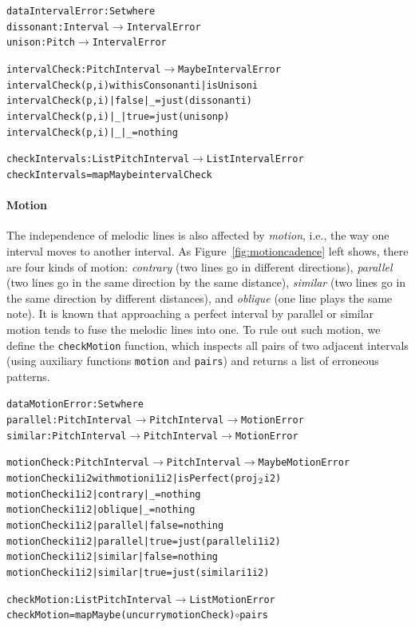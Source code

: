 \begin{alltt}
data IntervalError : Set where
  dissonant : Interval \(\rightarrow\) IntervalError
  unison    : Pitch    \(\rightarrow\) IntervalError

intervalCheck : PitchInterval \(\rightarrow\) Maybe IntervalError
intervalCheck (p , i) with isConsonant i | isUnison i
intervalCheck (p , i) | false | _    = just (dissonant i)
intervalCheck (p , i) | _     | true = just (unison p)
intervalCheck (p , i) | _     | _    = nothing

checkIntervals : List PitchInterval \(\rightarrow\) List IntervalError
checkIntervals = mapMaybe intervalCheck
\end{alltt}

\paragraph{Motion}

\MotionCadence

The independence of melodic lines is also affected by \emph{motion},
i.e., the way one interval moves to another interval.
As Figure~\ref{fig:motioncadence} left shows, there are four kinds of motion:
\emph{contrary} (two lines go in different directions),
\emph{parallel} (two lines go in the same direction by the same
distance), \emph{similar} (two lines go in the same direction by
different distances), and \emph{oblique} (one line plays the same note).
It is known that approaching a perfect interval by parallel or similar
motion tends to fuse the melodic lines into one.
To rule out such motion, we define the \texttt{checkMotion}
function, which inspects all pairs of two adjacent intervals (using 
auxiliary functions \texttt{motion} and \texttt{pairs}) and returns a
list of erroneous patterns.

\begin{alltt}
data MotionError : Set where
  parallel : PitchInterval \(\rightarrow\) PitchInterval \(\rightarrow\) MotionError
  similar  : PitchInterval \(\rightarrow\) PitchInterval \(\rightarrow\) MotionError

motionCheck : PitchInterval \(\rightarrow\) PitchInterval \(\rightarrow\) Maybe MotionError
motionCheck i1 i2 with motion i1 i2 | isPerfect (proj\(\sb{2}\) i2)
motionCheck i1 i2 | contrary | \_     = nothing
motionCheck i1 i2 | oblique  | \_     = nothing
motionCheck i1 i2 | parallel | false = nothing
motionCheck i1 i2 | parallel | true  = just (parallel i1 i2)
motionCheck i1 i2 | similar  | false = nothing
motionCheck i1 i2 | similar  | true  = just (similar i1 i2)

checkMotion : List PitchInterval \(\rightarrow\) List MotionError
checkMotion = mapMaybe (uncurry motionCheck) \(\circ\) pairs
\end{alltt}

